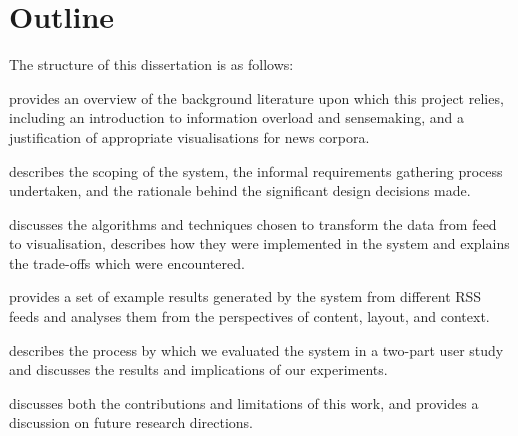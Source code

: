 \section*{Outline}
The structure of this dissertation is as follows: \vspace{-0.1cm}
\begin{description}[leftmargin=5.58em,style=nextline]
	\item [Chapter \ref{c:litreview}] provides an overview of the background literature upon which this project relies, including an introduction to information overload and sensemaking, and a justification of appropriate visualisations for news corpora.
	\item [Chapter \ref{c:reqs}] describes the scoping of the system, the informal requirements gathering process undertaken, and the rationale behind the significant design decisions made.
	\item [Chapter \ref{c:implementation}] discusses the algorithms and techniques chosen to transform the data from feed to visualisation, describes how they were implemented in the system and explains the trade-offs which were encountered.
	\item [Chapter \ref{c:results}] provides a set of example results generated by the system from different RSS feeds and analyses them from the perspectives of content, layout, and context.
	\item [Chapter \ref{c:evaluation}] describes the process by which we evaluated the system in a two-part user study and discusses the results and implications of our experiments.
	\item [Chapter \ref{c:conclusions}] discusses both the contributions and limitations of this work, and provides a discussion on future research directions.
\end{description}

